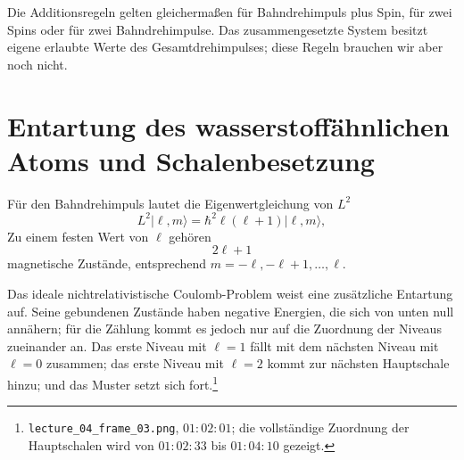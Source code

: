 Die Additionsregeln gelten gleichermaßen für Bahndrehimpuls plus Spin, für zwei Spins oder für zwei Bahndrehimpulse. Das zusammengesetzte System besitzt eigene erlaubte Werte des Gesamtdrehimpulses; diese Regeln brauchen wir aber noch nicht.

\begin{classroomqa}
\end{classroomqa}

\section{Entartung des wasserstoffähnlichen Atoms und Schalenbesetzung}

Für den Bahndrehimpuls lautet die Eigenwertgleichung von \(L^{2}\)
\begin{equation}
L^{2}\lvert\ell,m\rangle
=\hbar^{2}\ell(\ell+1)\lvert\ell,m\rangle,
\end{equation}
Zu einem festen Wert von \(\ell\) gehören
\begin{equation}
2\ell+1
\end{equation}
magnetische Zustände, entsprechend \(m=-\ell,-\ell+1,\ldots,\ell\).

Das ideale nichtrelativistische Coulomb-Problem weist eine zusätzliche Entartung auf. Seine gebundenen Zustände haben negative Energien, die sich von unten null annähern; für die Zählung kommt es jedoch nur auf die Zuordnung der Niveaus zueinander an. Das erste Niveau mit \(\ell=1\) fällt mit dem nächsten Niveau mit \(\ell=0\) zusammen; das erste Niveau mit \(\ell=2\) kommt zur nächsten Hauptschale hinzu; und das Muster setzt sich fort.\footnote{\texttt{lecture\_04\_frame\_03.png}, \(01{:}02{:}01\); die vollständige Zuordnung der Hauptschalen wird von \(01{:}02{:}33\) bis \(01{:}04{:}10\) gezeigt.}

